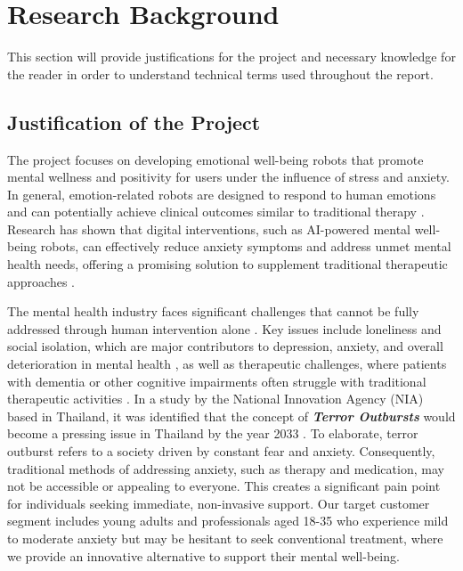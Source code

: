 \section{Research Background}
This section will provide justifications for the project and necessary knowledge for the reader in order to
understand technical terms used throughout the report.

\subsection{Justification of the Project}

The project focuses on developing emotional well-being robots that promote mental wellness and positivity for users under the influence of stress and anxiety. In general, emotion-related robots are designed to respond to human emotions and can potentially achieve clinical outcomes similar to traditional therapy \cite{Palmer2024.07.17.24310551}. Research has shown that digital interventions, such as AI-powered mental well-being robots, can effectively reduce anxiety symptoms and address unmet mental health needs, offering a promising solution to supplement traditional therapeutic approaches \cite{jarvis2024companion}.

The mental health industry faces significant challenges that cannot be fully addressed through human intervention alone \cite{charles-2024}. Key issues include loneliness and social isolation, which are major contributors to depression, anxiety, and overall deterioration in mental health \cite{GOH202372}, as well as therapeutic challenges, where patients with dementia or other cognitive impairments often struggle with traditional therapeutic activities \cite{Sukhawathanakul_Crizzle_Tuokko_Naglie_Rapoport_2021}. In a study by the National Innovation Agency (NIA) based in Thailand, it was identified that the concept of \textbf{\textit{Terror Outbursts}} would become a pressing issue in Thailand by the year 2033 \cite{nia2023}. To elaborate, terror outburst refers to a society driven by constant fear and anxiety. Consequently, traditional methods of addressing anxiety, such as therapy and medication, may not be accessible or appealing to everyone. This creates a significant pain point for individuals seeking immediate, non-invasive support. Our target customer segment includes young adults and professionals aged 18-35 who experience mild to moderate anxiety but may be hesitant to seek conventional treatment, where we provide an innovative alternative to support their mental well-being.

